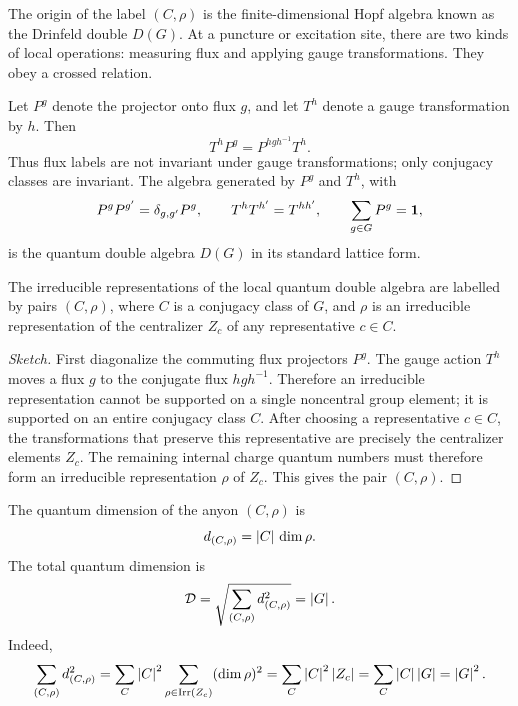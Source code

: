 The origin of the label \((C,\rho)\) is the finite-dimensional Hopf algebra known
as the Drinfeld double \(D(G)\).  At a puncture or excitation site, there are two
kinds of local operations: measuring flux and applying gauge transformations.
They obey a crossed relation.

Let \(P^g\) denote the projector onto flux \(g\), and let \(T^h\) denote a gauge
transformation by \(h\).  Then
\begin{equation}
\label{eq:local-double-crossed-relation}
    T^h P^g = P^{hgh^{-1}}T^h .
\end{equation}
Thus flux labels are not invariant under gauge transformations; only conjugacy
classes are invariant.  The algebra generated by \(P^g\) and \(T^h\), with
\begin{equation}
\label{eq:local-double-algebra-relations}
    P^gP^{g'}=\delta_{g,g'}P^g,
    \qquad
    T^hT^{h'}=T^{hh'},
    \qquad
    \sum_{g\in G}P^g=\mathbf{1},
\end{equation}
is the quantum double algebra \(D(G)\) in its standard lattice form.

\begin{proposition}
The irreducible representations of the local quantum double algebra are labelled
by pairs \((C,\rho)\), where \(C\) is a conjugacy class of \(G\), and \(\rho\) is
an irreducible representation of the centralizer \(Z_c\) of any representative
\(c\in C\).
\end{proposition}

\begin{proof}[Sketch]
First diagonalize the commuting flux projectors \(P^g\).  The gauge action
\(T^h\) moves a flux \(g\) to the conjugate flux \(hgh^{-1}\).  Therefore an
irreducible representation cannot be supported on a single noncentral group
element; it is supported on an entire conjugacy class \(C\).  After choosing a
representative \(c\in C\), the transformations that preserve this representative
are precisely the centralizer elements \(Z_c\).  The remaining internal charge
quantum numbers must therefore form an irreducible representation \(\rho\) of
\(Z_c\).  This gives the pair \((C,\rho)\).
\end{proof}

The quantum dimension of the anyon \((C,\rho)\) is
\begin{equation}
\label{eq:quantum-double-quantum-dimension}
    d_{(C,\rho)}=\left|C\right|\,\dim\rho .
\end{equation}
The total quantum dimension is
\begin{equation}
\label{eq:quantum-double-total-quantum-dimension}
    \mathcal{D}
    =
    \sqrt{\sum_{(C,\rho)}d_{(C,\rho)}^2}
    =\left|G\right| .
\end{equation}
Indeed,
\begin{equation}
\label{eq:quantum-double-total-dimension-check}
    \sum_{(C,\rho)}d_{(C,\rho)}^2
    =
    \sum_C \left|C\right|^2\sum_{\rho\in\operatorname{Irr}(Z_c)}(\dim\rho)^2
    =
    \sum_C \left|C\right|^2\left|Z_c\right|
    =
    \sum_C \left|C\right|\left|G\right|
    =
    \left|G\right|^2 .
\end{equation}

